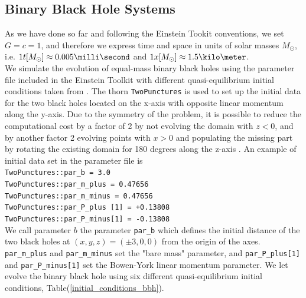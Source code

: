 \subsection{Binary Black Hole Systems}
As we have done so far and following the Einstein Tookit conventions, we set $G=c=1$, and therefore we express time and space in units of solar masses $M_{\odot}$, i.e. $1 t [M_{\odot}] \approx 0.005 \milli \second$ and $1 x [M_{\odot}] \approx 1.5 \kilo \meter$.\\
We simulate the evolution of equal-mass binary black holes using the parameter file included in the Einstein Toolkit \cite{loffler_einstein_2012} with different quasi-equilibrium initial conditions taken from \cite{tichy_quasi-equilibrium_2004}.
The thorn \texttt{TwoPunctures} \cite{Ansorg:2004ds} is used to set up the initial data for the two black holes located on the x-axis with opposite linear momentum along the y-axis.
Due to the symmetry of the problem, it is possible to reduce the computational cost by a factor of 2 by not evolving the domain with $z < 0$, and by another factor 2 evolving points with $x > 0$ and populating the missing part by rotating the existing domain for 180 degrees along the z-axis \cite{zilhaoIntroductionEinsteinToolkit2013}.
An example of initial data set in the parameter file is
\linebreak
\texttt{\\
TwoPunctures::par\_b             =  3.0 \\
TwoPunctures::par\_m\_plus        =  0.47656 \\
TwoPunctures::par\_m\_minus       =  0.47656 \\
TwoPunctures::par\_P\_plus [1]    = +0.13808 \\
TwoPunctures::par\_P\_minus[1]    = -0.13808
\\
}
\linebreak
We call parameter $b$ the parameter \texttt{par\_b} which defines the initial distance of the two black holes at $(x,y,z) = (\pm 3,0,0)$ from the origin of the axes. 
\texttt{par\_m\_plus} and \texttt{par\_m\_minus} set the "bare mass" parameter, and \texttt{par\_P\_plus[1]} and \texttt{par\_P\_minus[1]} set the Bowen-York linear momentum parameter.
We let evolve the binary black hole using six different quasi-equilibrium initial conditions, Table(\ref{initial_conditions_bbh}).

